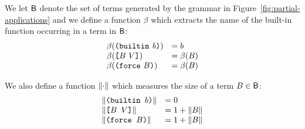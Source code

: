 \medskip
\noindent We let $\mathsf{B}$ denote the set of terms generated by the grammar
in Figure~\ref{fig:partial-applications} and
we define a function $\beta$ which extracts the name of the built-in
function occurring in a term in $\mathsf{B}$:
$$
 \begin{array}{ll}
 \beta(\texttt{(} \texttt{builtin} ~ \mathit{b} \texttt{)}) &= b\\
 \beta(\texttt{[} B ~ V \texttt{]}) & =\beta(B)\\
 \beta({\texttt{(} \texttt{force} ~ B \texttt{)}}) & =\beta(B)\\
\end{array}
$$%


\noindent We also define a function $\lVert \cdot \rVert$ which measures the size of
a term $B \in \mathsf{B}$:
$$
\begin{array}{ll}
\lVert \texttt{(builtin $b$)} \rVert &= 0\\
\lVert \texttt{[$B$ $V$]} \rVert &= 1+\lVert B \rVert\\
\lVert \texttt{(force $B$)} \rVert & = 1+\lVert B \rVert
\end{array}
$$%





